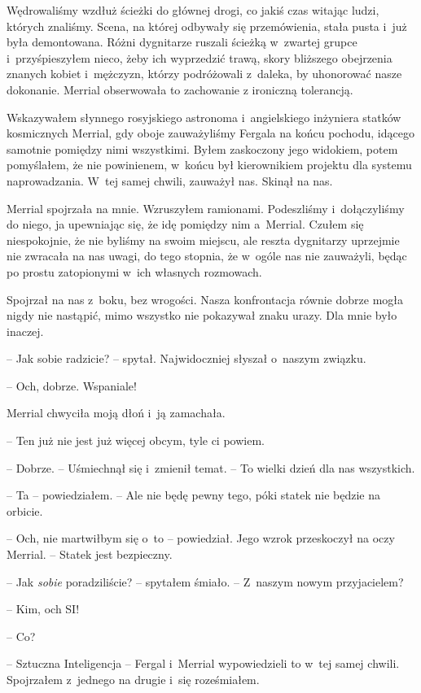 \documentclass[oneside,polish,11pt,sfheadings]{mwbk}
\begin{document}
Wędrowaliśmy wzdłuż ścieżki do głównej drogi, co jakiś czas witając
ludzi, których znaliśmy. Scena, na której odbywały się przemówienia,
stała pusta i~już była demontowana. Różni dygnitarze ruszali ścieżką w~zwartej grupce i~przyśpieszyłem nieco, żeby ich wyprzedzić trawą, skory
bliższego obejrzenia znanych kobiet i~mężczyzn, którzy podróżowali z~daleka, by uhonorować nasze dokonanie. Merrial obserwowała to zachowanie
z ironiczną tolerancją.

Wskazywałem słynnego rosyjskiego astronoma i~angielskiego inżyniera
statków kosmicznych Merrial, gdy oboje zauważyliśmy Fergala na końcu
pochodu, idącego samotnie pomiędzy nimi wszystkimi. Byłem zaskoczony
jego widokiem, potem pomyślałem, że nie powinienem, w~końcu był
kierownikiem projektu dla systemu naprowadzania. W~tej samej chwili,
zauważył nas. Skinął na nas.

Merrial spojrzała na mnie. Wzruszyłem ramionami. Podeszliśmy i~dołączyliśmy do niego, ja upewniając się, że idę pomiędzy nim a~Merrial.
Czułem się niespokojnie, że nie byliśmy na swoim miejscu, ale reszta
dygnitarzy uprzejmie nie zwracała na nas uwagi, do tego stopnia, że w~ogóle nas nie zauważyli, będąc po prostu zatopionymi w~ich własnych
rozmowach.

Spojrzał na nas z~boku, bez wrogości. Nasza konfrontacja równie dobrze
mogła nigdy nie nastąpić, mimo wszystko nie pokazywał znaku urazy. Dla
mnie było inaczej.

-- Jak sobie radzicie? -- spytał. Najwidoczniej słyszał o~naszym związku.

-- Och, dobrze. Wspaniale!

Merrial chwyciła moją dłoń i~ją zamachała. 

-- Ten już nie jest już więcej
obcym, tyle ci powiem.

-- Dobrze. -- Uśmiechnął się i~zmienił temat. -- To wielki dzień dla nas
wszystkich.

-- Ta -- powiedziałem. -- Ale nie będę pewny tego, póki statek nie będzie
na orbicie.

-- Och, nie martwiłbym się o~to -- powiedział. Jego wzrok przeskoczył na
oczy Merrial. -- Statek jest bezpieczny.

-- Jak \textit{sobie} poradziliście? -- spytałem śmiało. -- Z~naszym nowym
przyjacielem?

-- Kim, och SI!

-- Co?

-- Sztuczna Inteligencja -- Fergal i~Merrial wypowiedzieli to w~tej samej
chwili. Spojrzałem z~jednego na drugie i~się roześmiałem.
\end{document}
